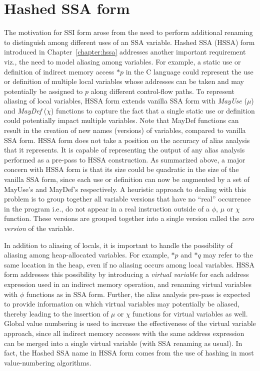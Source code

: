 \section{Hashed SSA form}

The motivation for SSI form arose from the need to perform additional renaming to distinguish among different uses of an SSA variable. 
Hashed SSA (HSSA) form introduced in Chapter~\ref{chapter:hssa} addresses another important requirement viz., the need to model aliasing among variables. 
For example, a static use or definition of indirect memory access $*p$ in the C language could represent the use or definition of multiple local variables whose addresses can be taken and may potentially be assigned to $p$ along different control-flow paths. 
To represent aliasing of local variables, HSSA form extends vanilla SSA form with {\em MayUse} ($\mu$) and {\em MayDef} ($\chi$) functions to capture the fact that a single static use or definition could potentially impact multiple variables. 
Note that MayDef functions can result in the creation of new names (versions) of variables, compared to vanilla SSA form. 
HSSA form does not take a position on the accuracy of alias analysis that it represents. 
It is capable of representing the output of any alias analysis performed as a pre-pass to HSSA construction. 
As summarized above, a major concern with HSSA form is that its size could be quadratic in the size of the vanilla SSA form, since each use or definition can now be augmented by a set of MayUse's and MayDef's respectively. 
A heuristic approach to dealing with this problem is to group together all variable versions that have no ``real'' occurrence in the program i.e., do not appear in a real instruction outside of a $\phi$, $\mu$ or $\chi$ function. 
These versions are grouped together into a single version called the {\em zero version} of the variable.

In addition to aliasing of locals, it is important to handle the possibility of aliasing among heap-allocated variables. 
For example, $*p$ and $*q$ may refer to the same location in the heap, even if no aliasing occurs among local variables. 
HSSA form addresses this possibility by introducing a {\em virtual variable} for each address expression used in an indirect memory operation, and renaming virtual variables with $\phi$ functions as in SSA form. 
Further, the alias analysis pre-pass is expected to provide information on which virtual variables may potentially be aliased, thereby leading to the insertion of $\mu$ or $\chi$ functions for virtual variables as well. 
Global value numbering is used to increase the effectiveness of the virtual variable approach, since all indirect memory accesses with the same address expression can be merged into a single virtual variable (with SSA renaming as usual). 
In fact, the Hashed SSA name in HSSA form comes from the use of hashing in most value-numbering algorithms.

